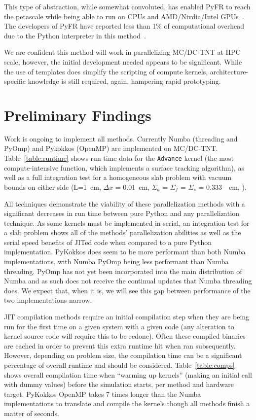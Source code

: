 This type of abstraction, while somewhat convoluted, has enabled PyFR to reach the petascale while being able to run on CPUs and AMD/Nivdia/Intel GPUs~\cite{pyfrPetascale}.
The developers of PyFR have reported less than 1\% of computational overhead due to the Python interpreter in this method~\cite{PyFR1p}.

We are confident this method will work in parallelizing MC/DC-TNT at HPC scale; however, the initial development needed appears to be significant.
While the use of templates does simplify the scripting of compute kernels, architecture-specific knowledge is still required, again, hampering rapid prototyping.

\section{Preliminary Findings}

Work is ongoing to implement all methods. 
Currently Numba (threading and PyOmp) and Pykokkos (OpenMP) are implemented on MC/DC-TNT.
Table~\ref{table:runtime} shows run time data for the \texttt{Advance} kernel (the most compute-intensive function, which implements a surface tracking algorithm), as well as a full integration test for a homogeneous slab problem with vacuum bounds on either side (L=\SI{1}{cm}, $\Delta x$ = \SI{0.01}{\cm}, $\Sigma_a$ = $\Sigma_f$ = $\Sigma_s$ = \SI{0.333}{\per\cm}, ).

All techniques demonstrate the viability of these parallelization methods with a significant decreases in run time between pure Python and any parallelization technique.
As some kernels must be implemented in serial, an integration test for a slab problem shows all of the methods' parallelization abilities as well as the serial speed benefits of JITed code when compared to a pure Python implementation.
PyKokkos does seem to be more performant than both Numba implementations, with Numba PyOmp being less performant than Numba threading. 
PyOmp has not yet been incorporated into the main distribution of Numba and as such does not receive the continual updates that Numba threading does. 
We expect that, when it is, we will see this gap between performance of the two implementations narrow.

JIT compilation methods require an initial compilation step when they are being run for the first time on a given system with a given code (any alteration to kernel source code will require this to be redone).
Often these compiled binaries are cached in order to prevent this extra runtime hit when ran subsequently.
However, depending on problem size, the compilation time can be a significant percentage of overall runtime and should be considered. Table~\ref{table:comps} shows overall compilation time when ``warming up kernels'' (making an initial call with dummy values) before the simulation starts, per method and hardware target.
PyKokkos OpenMP takes 7 times longer than the Numba implementations to translate and compile the kernels though all methods finish a matter of seconds.


